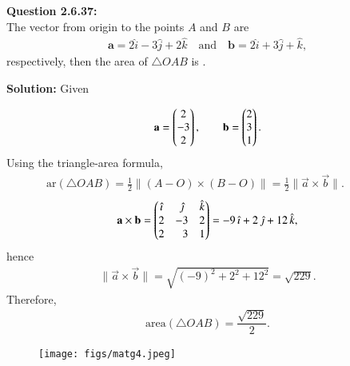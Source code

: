 \documentclass[journal]{IEEEtran}
\begin{document}



\textbf{Question 2.6.37:} \\
The vector from origin to the points $A$ and $B$ are \begin{align}
\mathbf{a} = 2\hat{i} - 3\hat{j} + 2\hat{k} \quad \text{and} 
 \quad \mathbf{b} = 2\hat{i} + 3\hat{j} + \hat{k},
 \end{align}respectively, then the area of $\triangle OAB$ is \underline{\hspace{2cm}}.

\textbf{Solution:}
Given

\begin{align}
\mathbf a=\begin{pmatrix}2\\-3\\2\end{pmatrix},\qquad
\mathbf b=\begin{pmatrix}2\\3\\1\end{pmatrix}.
\end{align}
Using the triangle-area formula,
\begin{align}
\text{ar}(\triangle OAB)=\frac12\|(A-O)\times(B-O)\|
=\frac12\|\vec a\times\vec b\|. \; \; \; \; \; \; \; \;
 \end{align}
\begin{align}
\mathbf a\times\mathbf b=
\begin{pmatrix}
\hat{\imath}&\hat{\jmath}&\hat{k}\\
2&-3&2\\
2&\phantom{-}3&1
\end{pmatrix}
=-9\,\hat{\imath}+2\,\hat{\jmath}+12\,\hat{k},
 \end{align}
hence
\begin{align}
\|\vec a\times\vec b\|=\sqrt{(-9)^2+2^2+12^2}=\sqrt{229}.
\end{align}
Therefore,
\begin{align}
\boxed{\text{area}(\triangle OAB)=\dfrac{\sqrt{229}}{2}}.
\end{align}

\newpage
\begin{figure}
    \centering
\texttt{[image: figs/matg4.jpeg]}
    \caption{}
    \label{fig:placeholder}
\end{figure}
\end{document}
